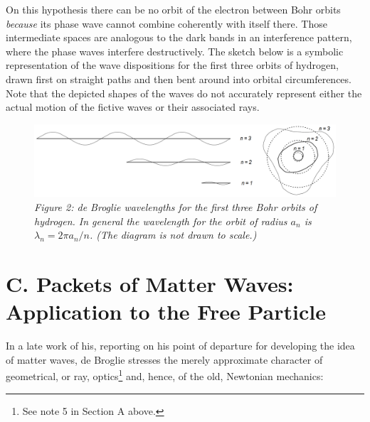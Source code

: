 On this hypothesis there can be no orbit of the electron between Bohr
orbits \emph{because} its phase wave cannot combine coherently with
itself there. Those intermediate spaces are analogous to the dark bands
in an interference pattern, where the phase waves interfere
destructively. The sketch below is a symbolic representation of the wave
dispositions for the first three orbits of hydrogen, drawn first on
straight paths and then bent around into orbital circumferences. Note
that the depicted shapes of the waves do not accurately represent either
the actual motion of the fictive waves or their associated rays.

\begin{figure}[h] %
  \begin{center}
    \includegraphics[width=\textwidth]{images/08_debroglie/standing-waves.png}
  \end{center}
  \caption*{\emph{Figure 2: de Broglie wavelengths for the first three Bohr orbits of
     hydrogen. In general the wavelength for the orbit of radius $a_n$ is
     $\lambda_n = 2\pi a_n/n$. (The diagram is not drawn to scale.)}}
\end{figure}



\section*{C. Packets of Matter Waves: Application to the Free Particle }

In a late work of his, reporting on his point of departure for
developing the idea of matter waves, de Broglie stresses the merely
approximate character of geometrical, or ray, optics\footnote{See note 5
  in Section A above.} and, hence, of the old, Newtonian mechanics:

